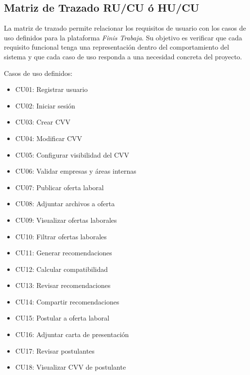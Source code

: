 \documentclass[11pt,a4paper]{Plantilla}
\begin{document}
\subsection{Matriz de Trazado RU/CU ó HU/CU}%
La matriz de trazado permite relacionar los requisitos de usuario con los casos de uso definidos para la plataforma \textit{Finis Trabaja}. Su objetivo es verificar que cada requisito funcional tenga una representación dentro del comportamiento del sistema y que cada caso de uso responda a una necesidad concreta del proyecto.

Casos de uso definidos:

\begin{itemize}
    \item CU01: Registrar usuario
    \item CU02: Iniciar sesión
    \item CU03: Crear CVV
    \item CU04: Modificar CVV
    \item CU05: Configurar visibilidad del CVV
    \item CU06: Validar empresas y áreas internas
    \item CU07: Publicar oferta laboral
    \item CU08: Adjuntar archivos a oferta
    \item CU09: Visualizar ofertas laborales
    \item CU10: Filtrar ofertas laborales
    \item CU11: Generar recomendaciones
    \item CU12: Calcular compatibilidad
    \item CU13: Revisar recomendaciones
    \item CU14: Compartir recomendaciones
    \item CU15: Postular a oferta laboral
    \item CU16: Adjuntar carta de presentación
    \item CU17: Revisar postulantes
    \item CU18: Visualizar CVV de postulante
\end{itemize}
\end{document}
